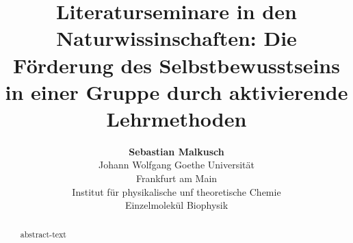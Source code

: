 \documentclass[10pt,a4paper,onecolumn,notitlepage]{article}
\author{
	{\bf Sebastian Malkusch}\\Johann Wolfgang Goethe Universität\\Frankfurt am Main\\Institut für physikalische unf theoretische Chemie\\Einzelmolekül Biophysik
}
\title{
Literaturseminare in den Naturwissinschaften: Die Förderung des Selbstbewusstseins in einer Gruppe durch aktivierende Lehrmethoden
}
\begin{document}
\maketitle
\begin{abstract}
   abstract-text
\end{abstract}
\tableofcontents
\twocolumn
\sloppy




%
%
\end{document}
